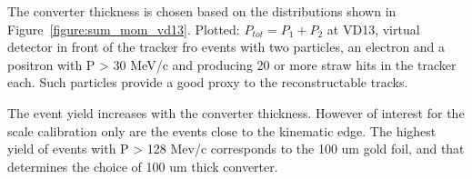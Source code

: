 The converter thickness is chosen based on the distributions shown in Figure~\ref{figure:sum_mom_vd13}.
Plotted: $P_{tot} = P_1 + P_2$ at VD13, virtual detector in front of the tracker fro events with
two particles, an electron and a positron with P > 30 MeV/c and producing 20 or more straw hits in the tracker each.
Such particles provide a good proxy to the reconstructable tracks.

The event yield increases with the converter thickness. However of interest for the scale calibration only
are the events close to the kinematic edge.
The highest yield of events with P > 128 Mev/c corresponds to the 100 um gold foil, and that determines
the choice of 100 um thick converter.

